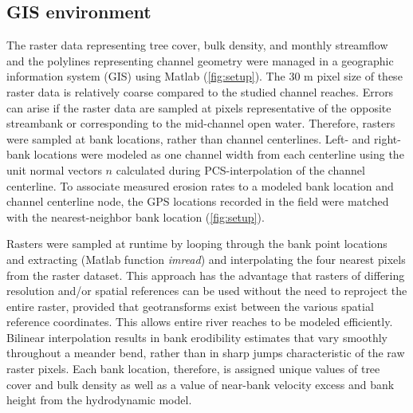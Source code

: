 \documentclass[preprint, review, authoryear, 12pt]{elsarticle}
\begin{document}
\subsection{GIS environment}
The raster data representing tree cover, bulk density, and monthly streamflow and the polylines representing channel geometry were managed in a geographic information system (GIS) using Matlab (\cref{fig:setup}). The 30 m pixel size of these raster data is relatively coarse compared to the studied channel reaches. Errors can arise if the raster data are sampled at pixels representative of the opposite streambank or corresponding to the mid-channel open water. Therefore, rasters were sampled at bank locations, rather than channel centerlines. Left- and right-bank locations were modeled as one channel width from each centerline using the unit normal vectors $n$ calculated during PCS-interpolation of the channel centerline. To associate measured erosion rates to a modeled bank location and channel centerline node, the GPS locations recorded in the field were matched with the nearest-neighbor bank location (\cref{fig:setup}).

Rasters were sampled at runtime by looping through the bank point locations and extracting (Matlab function \emph{imread}) and interpolating the four nearest pixels from the raster dataset. This approach has the advantage that rasters of differing resolution and/or spatial references can be used without the need to reproject the entire raster, provided that geotransforms exist between the various spatial reference coordinates. This allows entire river reaches to be modeled efficiently. Bilinear interpolation results in bank erodibility estimates that vary smoothly throughout a meander bend, rather than in sharp jumps characteristic of the raw raster pixels. Each bank location, therefore, is assigned unique values of tree cover and bulk density as well as a value of near-bank velocity excess and bank height from the hydrodynamic model.
\end{document}
